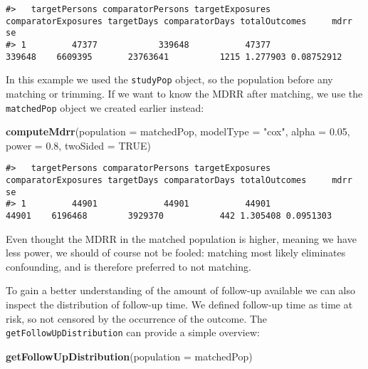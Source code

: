 \documentclass[]{article}
\newenvironment{Shaded}{\begin{snugshade}}{\end{snugshade}}
\newcommand{\DataTypeTok}[1]{\textcolor[rgb]{0.13,0.29,0.53}{#1}}
\newcommand{\FloatTok}[1]{\textcolor[rgb]{0.00,0.00,0.81}{#1}}
\newcommand{\KeywordTok}[1]{\textcolor[rgb]{0.13,0.29,0.53}{\textbf{#1}}}
\newcommand{\NormalTok}[1]{#1}
\newcommand{\OtherTok}[1]{\textcolor[rgb]{0.56,0.35,0.01}{#1}}
\newcommand{\StringTok}[1]{\textcolor[rgb]{0.31,0.60,0.02}{#1}}
\begin{document}
\fontsize{6.5}{6.5}
\selectfont

\begin{verbatim}
#>   targetPersons comparatorPersons targetExposures comparatorExposures targetDays comparatorDays totalOutcomes     mdrr         se
#> 1         47377            339648           47377              339648    6609395       23763641          1215 1.277903 0.08752912
\end{verbatim}

\fontsize{10}{12}
\selectfont

In this example we used the \texttt{studyPop} object, so the population
before any matching or trimming. If we want to know the MDRR after
matching, we use the \texttt{matchedPop} object we created earlier
instead:

\begin{Shaded}
\begin{Highlighting}[]
\KeywordTok{computeMdrr}\NormalTok{(}\DataTypeTok{population =}\NormalTok{ matchedPop,}
            \DataTypeTok{modelType =} \StringTok{"cox"}\NormalTok{,}
            \DataTypeTok{alpha =} \FloatTok{0.05}\NormalTok{,}
            \DataTypeTok{power =} \FloatTok{0.8}\NormalTok{,}
            \DataTypeTok{twoSided =} \OtherTok{TRUE}\NormalTok{)}
\end{Highlighting}
\end{Shaded}

\fontsize{6.5}{6.5}
\selectfont

\begin{verbatim}
#>   targetPersons comparatorPersons targetExposures comparatorExposures targetDays comparatorDays totalOutcomes     mdrr        se
#> 1         44901             44901           44901               44901    6196468        3929370           442 1.305408 0.0951303
\end{verbatim}

\fontsize{10}{12}
\selectfont

Even thought the MDRR in the matched population is higher, meaning we
have less power, we should of course not be fooled: matching most likely
eliminates confounding, and is therefore preferred to not matching.

To gain a better understanding of the amount of follow-up available we
can also inspect the distribution of follow-up time. We defined
follow-up time as time at risk, so not censored by the occurrence of the
outcome. The \texttt{getFollowUpDistribution} can provide a simple
overview:

\begin{Shaded}
\begin{Highlighting}[]
\KeywordTok{getFollowUpDistribution}\NormalTok{(}\DataTypeTok{population =}\NormalTok{ matchedPop)}
\end{Highlighting}
\end{Shaded}
\end{document}
